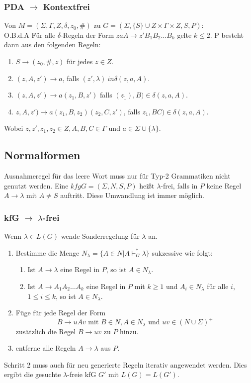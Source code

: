 \documentclass[9pt, a4paper]{article}
\begin{document}
\subsubsection{PDA $\to$ Kontextfrei}
 Von $M = (\Sigma, \Gamma, Z, \delta, z_0, \#)$ zu $G = (\Sigma, \{S\} \cup Z \times \Gamma \times Z, S, P)$:\\
 O.B.d.A Für alle $\delta$-Regeln der Form $zaA \to z'B_1B_2\dots B_k$ gelte $k \le 2$.
 P besteht dann aus den folgenden Regeln:
 \begin{enumerate}
 	\item $S \to (z_0, \#, z)$ für jedes $z \in Z$.
 	\item $(z, A, z') \to a$, falls $(z', \lambda) \ in \delta(z, a, A)$.
 	\item $(z, A, z') \to a(z_1, B, z')$ falls $(z_1), B) \in \delta(z, a, A)$.
 	\item $z, A, z') \to a(z_1, B, z_2)(z_2, C, z')$, falls $z_1, BC) \in \delta(z, a, A)$.
 \end{enumerate}
 Wobei $z, z', z_1, z_2 \in Z, A, B, C \in \Gamma$ und $a \in \Sigma \cup \{\lambda\}$.

\subsection{Normalformen}
Ausnahmeregel für das leere Wort muss nur für Typ-2 Grammatiken nicht genutzt werden. Eine $kfg G = (\Sigma, N, S, P)$ heißt $\lambda$-frei, falls in $P$ keine Regel $A \to \lambda$ mit $A \neq S$ auftritt. Diese Umwandlung ist immer möglich.
\subsubsection{kfG $\to$ $\lambda$-frei}
Wenn $\lambda \in L(G)$ wende Sonderregelung für $\lambda$ an.
\begin{enumerate}
	\item Bestimme die Menge $N_\lambda=\{A \in N | A \vdash^*_G \lambda\}$ sukzessive wie folgt:
	\begin{enumerate}
		\item Ist $A \to \lambda$ eine Regel in $P$, so ist $A \in N_\lambda$.
		\item Ist $ A \to A_1 A_2 \dots A_k $ eine Regel in $P$ mit $k \geq 1$ und $A_i \in N_\lambda$ für alle $i$, $1 \leq i \leq k$, so ist $A \in N_\lambda$.
	\end{enumerate}
	\item Füge für jede Regel der Form
	$$B \to uAv \text{ mit } B \in N, A\in N_\lambda \text{ und } uv \in (N \cup \Sigma)^+$$
	zusätzlich die Regel $B \to uv$ zu $P$ hinzu.
	\item entferne alle Regeln $A \to \lambda$ aus $P$.
\end{enumerate}
Schritt 2 muss auch für neu generierte Regeln iterativ angewendet werden. Dies ergibt die gesuchte $\lambda$-freie kfG $G'$ mit $L(G) =L(G')$.
\end{document}
